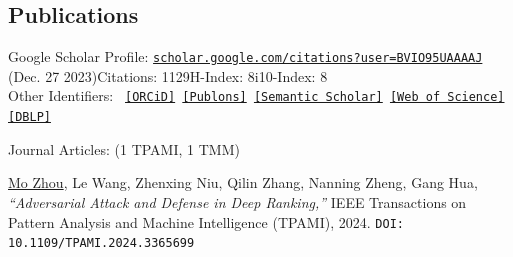 \documentclass[10pt,margin,line,pifont,palatino,courier]{res}
\begin{document}
\begin{resume}



%


\section{\sc Publications}
	Google Scholar Profile:
	\href{https://scholar.google.com/citations?user=BVIO95UAAAAJ}{\small\texttt{scholar.google.com/citations?user=BVIO95UAAAAJ}}\\
	\hspace*{9.7em}(Dec. 27 2023)\qquad Citations: 1129\qquad H-Index: 8\qquad i10-Index: 8\\
	Other Identifiers:
	{\footnotesize\tt
	\href{https://orcid.org/0000-0003-3813-4875}{[ORCiD]}
	\href{https://publons.com/researcher/4930582/mo-zhou}{[Publons]}
	\href{https://www.semanticscholar.org/author/Mo-Zhou/2109097390}{[Semantic Scholar]}
	\href{https://www.webofscience.com/wos/author/record/AAC-2403-2022}{[Web of Science]}
    \href{https://dblp.org/pid/24/4846}{[DBLP]}
	}

{\sc Journal Articles:} \hfill(1 TPAMI, 1 TMM)\\

\begin{enumerate}[noitemsep, leftmargin=*, label={[J0{\arabic*}]}]

\item \underline{Mo Zhou},
\reversemarginpar{}
Le Wang, Zhenxing Niu, Qilin Zhang, Nanning Zheng, Gang Hua,
\textit{``Adversarial Attack and Defense in Deep Ranking,''}
IEEE Transactions on Pattern Analysis and Machine Intelligence (TPAMI), 2024.
\texttt{DOI: 10.1109/TPAMI.2024.3365699}


\end{enumerate}
\end{resume}
\end{document}
